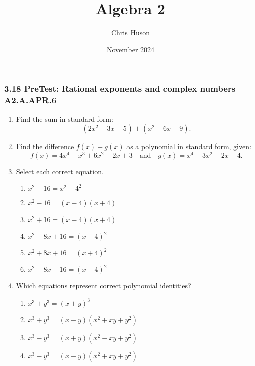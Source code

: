 \documentclass[12pt, twoside]{article}
\title{Algebra 2}
\author{Chris Huson}
\date{November 2024}
\begin{document}
\subsubsection*{3.18 PreTest: Rational exponents and complex numbers \hfill A2.A.APR.6}
\begin{enumerate}[itemsep=0.5cm]
\subsubsection*{A2-APR.1 Perform operations with polynomials}
\item Find the sum in standard form:
\[
(2x^2 - 3x - 5) + (x^2 - 6x + 9).
\] \vspace{4cm}

\item Find the difference \(f(x) - g(x)\) as a polynomial in standard form, given:
\[
f(x) = 4x^4 - x^3 + 6x^2 - 2x + 3 \quad \text{and} \quad g(x) = x^4 + 3x^2 - 2x - 4.
\] \vspace{4cm}

\item Select each correct equation.
\begin{multicols}{2}
    \begin{enumerate}
    \item $x^2 - 16 = x^2 - 4^2$
    \item $x^2 - 16 = (x-4)(x+4)$
    \item $x^2 + 16 = (x-4)(x+4)$
    \item $x^2 - 8x + 16 = (x-4)^2$
    \item $x^2 + 8x + 16 = (x+4)^2$
    \item $x^2 - 8x - 16 = (x-4)^2$
    \end{enumerate}
\end{multicols}
        
\item Which equations represent correct polynomial identities?
\begin{multicols}{2}
    \begin{enumerate}
    \item \(x^3 + y^3 = (x + y)^3\)
    \item \(x^3 + y^3 = (x - y)(x^2 + xy + y^2)\)
    \item \(x^3 - y^3 = (x + y)(x^2 - xy + y^2)\)
    \item \(x^3 - y^3 = (x - y)(x^2 + xy + y^2)\)
\end{enumerate}
\end{multicols}
    

\end{enumerate}
\end{document}
